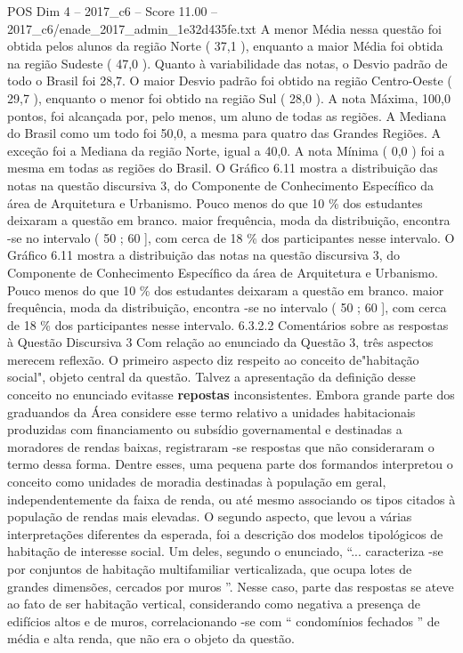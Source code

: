 \begin{textsample}{POS Dim 4 – 2017\_c6 – Score 11.00 – 2017\_c6/enade\_2017\_admin\_1e32d435fe.txt}
A menor Média nessa questão foi obtida pelos alunos da região Norte ( 37,1 ), enquanto a maior Média foi obtida na região Sudeste ( 47,0 ).
Quanto à variabilidade das notas, o Desvio padrão de todo o Brasil foi 28,7.
O maior Desvio padrão foi obtido na região Centro-Oeste ( 29,7 ), enquanto o menor foi obtido na região Sul ( 28,0 ).
A nota Máxima, 100,0 pontos, foi alcançada por, pelo menos, um aluno de todas as regiões.
A Mediana do Brasil como um todo foi 50,0, a mesma para quatro das Grandes Regiões.
A exceção foi a Mediana da região Norte, igual a 40,0.
A nota Mínima ( 0,0 ) foi a mesma em todas as regiões do Brasil.
O Gráfico 6.11 mostra a distribuição das notas na questão discursiva 3, do Componente de Conhecimento Específico da área de Arquitetura e Urbanismo.
Pouco menos do que 10 \% dos estudantes deixaram a questão em branco. maior frequência, moda da distribuição, encontra -se no intervalo ( 50 ; 60 ], com cerca de 18 \% dos participantes nesse intervalo.
O Gráfico 6.11 mostra a distribuição das notas na questão discursiva 3, do Componente de Conhecimento Específico da área de Arquitetura e Urbanismo.
Pouco menos do que 10 \% dos estudantes deixaram a questão em branco. maior frequência, moda da distribuição, encontra -se no intervalo ( 50 ; 60 ], com cerca de 18 \% dos participantes nesse intervalo. 6.3.2.2 Comentários sobre as respostas à Questão Discursiva 3 Com relação ao enunciado da Questão 3, três aspectos merecem reflexão.
O primeiro aspecto diz respeito ao conceito de"habitação social", objeto central da questão.
Talvez a apresentação da definição desse conceito no enunciado evitasse \textbf{repostas} inconsistentes.
Embora grande parte dos graduandos da Área considere esse termo relativo a unidades habitacionais produzidas com financiamento ou subsídio governamental e destinadas a moradores de rendas baixas, registraram -se respostas que não consideraram o termo dessa forma.
Dentre esses, uma pequena parte dos formandos interpretou o conceito como unidades de moradia destinadas à população em geral, independentemente da faixa de renda, ou até mesmo associando os tipos citados à população de rendas mais elevadas.
O segundo aspecto, que levou a várias interpretações diferentes da esperada, foi a descrição dos modelos tipológicos de habitação de interesse social.
Um deles, segundo o enunciado, “... caracteriza -se por conjuntos de habitação multifamiliar verticalizada, que ocupa lotes de grandes dimensões, cercados por muros ”.
Nesse caso, parte das respostas se ateve ao fato de ser habitação vertical, considerando como negativa a presença de edifícios altos e de muros, correlacionando -se com “ condomínios fechados ” de média e alta renda, que não era o objeto da questão.

\end{textsample}
